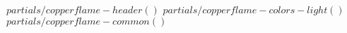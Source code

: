 $ partials/copperflame-header() $
$ partials/copperflame-colors-light() $
$ partials/copperflame-common() $
